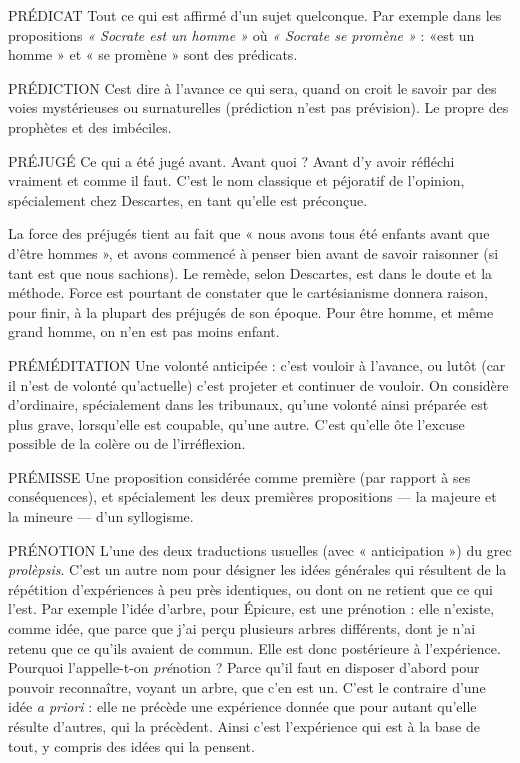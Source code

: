 PRÉDICAT Tout ce qui est affirmé d’un sujet quelconque. Par exemple
dans les propositions {\it « Socrate est un homme »} où {\it « Socrate se
promène »} : «est un homme » et « se promène » sont des prédicats.

PRÉDICTION Cest dire à l'avance ce qui sera, quand on croit le savoir par
des voies mystérieuses ou surnaturelles (prédiction n’est pas
prévision). Le propre des prophètes et des imbéciles.

PRÉJUGÉ Ce qui a été jugé avant. Avant quoi ? Avant d’y avoir réfléchi
vraiment et comme il faut. C’est le nom classique et péjoratif de
l'opinion, spécialement chez Descartes, en tant qu’elle est préconçue.

La force des préjugés tient au fait que « nous avons tous été enfants avant
que d’être hommes », et avons commencé à penser bien avant de savoir raisonner
(si tant est que nous sachions). Le remède, selon Descartes, est dans le
doute et la méthode. Force est pourtant de constater que le cartésianisme donnera
raison, pour finir, à la plupart des préjugés de son époque. Pour être
homme, et même grand homme, on n’en est pas moins enfant.

PRÉMÉDITATION Une volonté anticipée : c’est vouloir à l'avance, ou
lutôt (car il n’est de volonté qu’actuelle) c’est projeter
et continuer de vouloir. On considère d'ordinaire, spécialement dans les tribunaux,
qu’une volonté ainsi préparée est plus grave, lorsqu'elle est coupable,
qu’une autre. C’est qu’elle ôte l’excuse possible de la colère ou de l’irréflexion.

PRÉMISSE Une proposition considérée comme première (par rapport à ses
conséquences), et spécialement les deux premières propositions
— la majeure et la mineure — d’un syllogisme.

PRÉNOTION L'une des deux traductions usuelles (avec « anticipation ») du
grec {\it prolèpsis}. C’est un autre nom pour désigner les idées
générales qui résultent de la répétition d’expériences à peu près identiques, ou
dont on ne retient que ce qui l’est. Par exemple l’idée d’arbre, pour Épicure, est
une prénotion : elle n’existe, comme idée, que parce que j'ai perçu plusieurs
arbres différents, dont je n’ai retenu que ce qu'ils avaient de commun. Elle est
donc postérieure à l'expérience. Pourquoi l’appelle-t-on {\it pré}notion ? Parce qu'il
faut en disposer d’abord pour pouvoir reconnaître, voyant un arbre, que c'en
est un. C’est le contraire d’une idée {\it a priori} : elle ne précède une expérience
donnée que pour autant qu’elle résulte d’autres, qui la précèdent. Ainsi c’est
l'expérience qui est à la base de tout, y compris des idées qui la pensent.


